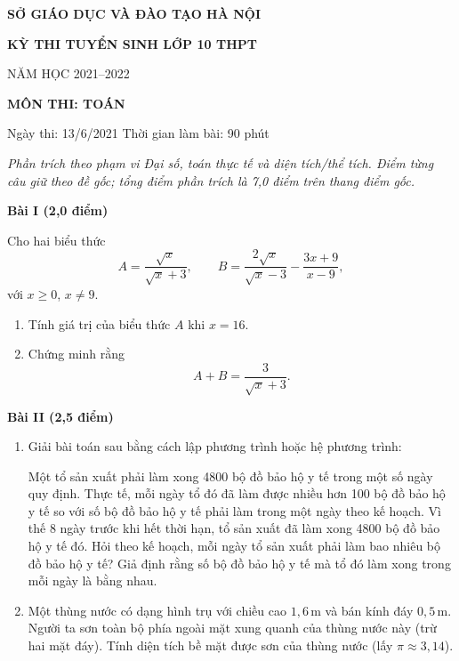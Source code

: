 \documentclass[12pt,a4paper]{article}
\begin{document}
\begin{center}
{\large\bfseries SỞ GIÁO DỤC VÀ ĐÀO TẠO HÀ NỘI}\par
{\Large\bfseries KỲ THI TUYỂN SINH LỚP 10 THPT}\par
{\large NĂM HỌC 2021--2022}\par
\vspace{4pt}
{\bfseries MÔN THI: TOÁN}\par
Ngày thi: 13/6/2021 \qquad Thời gian làm bài: 90 phút
\end{center}

\textit{Phần trích theo phạm vi Đại số, toán thực tế và diện tích/thể tích. Điểm từng câu giữ theo đề gốc; tổng điểm phần trích là 7,0 điểm trên thang điểm gốc.}

\textbf{Bài I (2,0 điểm)}

Cho hai biểu thức
\[
A=\frac{\sqrt{x}}{\sqrt{x}+3},\qquad
B=\frac{2\sqrt{x}}{\sqrt{x}-3}-\frac{3x+9}{x-9},
\]
với $x\geq 0$, $x\neq 9$.

\begin{enumerate}[label=\arabic*)]
  \item Tính giá trị của biểu thức $A$ khi $x=16$.
  \item Chứng minh rằng
  \[
  A+B=\frac{3}{\sqrt{x}+3}.
  \]
\end{enumerate}

\textbf{Bài II (2,5 điểm)}

\begin{enumerate}[label=\arabic*)]
  \item Giải bài toán sau bằng cách lập phương trình hoặc hệ phương trình:

  Một tổ sản xuất phải làm xong 4800 bộ đồ bảo hộ y tế trong một số ngày quy định. Thực tế, mỗi ngày tổ đó đã làm được nhiều hơn 100 bộ đồ bảo hộ y tế so với số bộ đồ bảo hộ y tế phải làm trong một ngày theo kế hoạch. Vì thế 8 ngày trước khi hết thời hạn, tổ sản xuất đã làm xong 4800 bộ đồ bảo hộ y tế đó. Hỏi theo kế hoạch, mỗi ngày tổ sản xuất phải làm bao nhiêu bộ đồ bảo hộ y tế? Giả định rằng số bộ đồ bảo hộ y tế mà tổ đó làm xong trong mỗi ngày là bằng nhau.

  \item Một thùng nước có dạng hình trụ với chiều cao $1{,}6\,\mathrm{m}$ và bán kính đáy $0{,}5\,\mathrm{m}$. Người ta sơn toàn bộ phía ngoài mặt xung quanh của thùng nước này (trừ hai mặt đáy). Tính diện tích bề mặt được sơn của thùng nước (lấy $\pi\approx 3{,}14$).
\end{enumerate}
\end{document}
